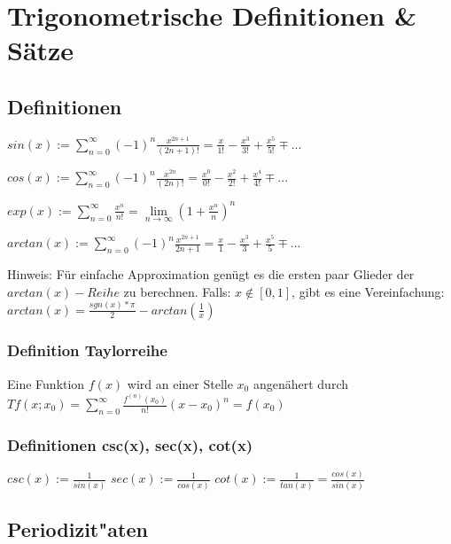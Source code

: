 
\section{Trigonometrische Definitionen \& Sätze}
\subsection{Definitionen}

$sin(x) := \sum_{n=0}^{\infty} (-1)^n \frac{x^{2n+1}}{(2n+1)!} = \frac{x}{1!} - \frac{x^3}{3!} + \frac{x^5}{5!} \mp ...$

$cos(x) := \sum_{n=0}^{\infty} (-1)^n \frac{x^{2n}}{(2n)!} = \frac{x^0}{0!} - \frac{x^2}{2!} + \frac{x^4}{4!} \mp ...$

$exp(x) := \sum_{n=0}^{\infty} \frac{x^{n}}{n!} = \lim\limits_{n \rightarrow \infty}{(1 + \frac{x^{n}}{n})^n}$

$arctan(x) := \sum_{n=0}^{\infty} (-1)^n \frac{x^{2n+1}}{2n+1} = \frac{x}{1} - \frac{x^3}{3} + \frac{x^5}{5} \mp ...$

Hinweis: Für einfache Approximation genügt es die ersten paar Glieder der $arctan(x)-Reihe$ zu berechnen. \newline 
Falls: $x \notin [0,1]$, gibt es eine Vereinfachung:
$ arctan(x) = \frac{sgn(x) * \pi}{2} - arctan(\frac{1}{x}) $

\subsubsection{Definition Taylorreihe} Eine Funktion $f(x)$ wird an einer Stelle $x_0$ angenähert durch $Tf(x;x_0) = \sum_{n=0}^{\infty} \frac{f^{(n)}(x_0)}{n!}(x - x_0)^n = f(x_0)$ \\

\subsubsection{Definitionen csc(x), sec(x), cot(x)}
$csc(x) := \frac{1}{sin(x)}$ \hfil $sec(x) := \frac{1}{cos(x)}$ \hfil $cot(x) := \frac{1}{tan(x)} = \frac{cos(x)}{sin(x)}$





\subsection{Periodizit"aten}

